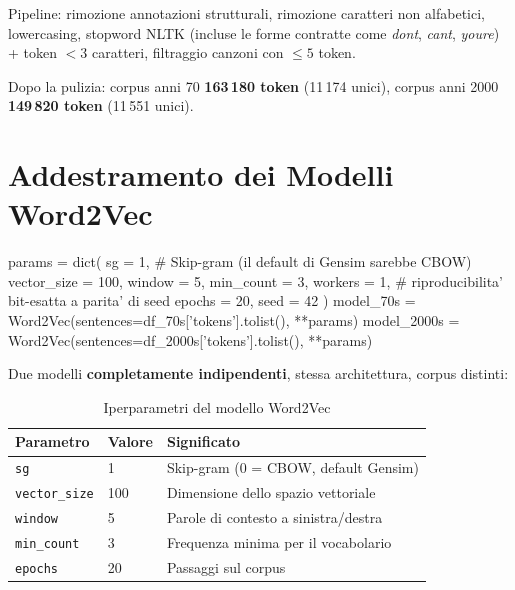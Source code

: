\documentclass[12pt,a4paper]{article}
\begin{document}
Pipeline: rimozione annotazioni strutturali, rimozione caratteri non alfabetici, lowercasing, stopword NLTK (incluse le forme contratte come \textit{dont}, \textit{cant}, \textit{youre}) + token $<3$ caratteri, filtraggio canzoni con $\le 5$ token.

Dopo la pulizia: corpus anni 70 \textbf{163\,180 token} (11\,174 unici), corpus anni 2000 \textbf{149\,820 token} (11\,551 unici).

\section{Addestramento dei Modelli Word2Vec}
\label{sec:addestramento-w2v}

\begin{pylisting}[title={Addestramento Word2Vec con Gensim}]
params = dict(
    sg          = 1,     # Skip-gram (il default di Gensim sarebbe CBOW)
    vector_size = 100, window = 5, min_count = 3,
    workers     = 1,     # riproducibilita' bit-esatta a parita' di seed
    epochs      = 20, seed = 42
)
model_70s   = Word2Vec(sentences=df_70s['tokens'].tolist(),   **params)
model_2000s = Word2Vec(sentences=df_2000s['tokens'].tolist(), **params)
\end{pylisting}

Due modelli \textbf{completamente indipendenti}, stessa architettura, corpus distinti:

\begin{table}[H]
  \centering
  \caption{Iperparametri del modello Word2Vec}
  \begin{tabular}{lll}
    \toprule
    \textbf{Parametro} & \textbf{Valore} & \textbf{Significato} \\
    \midrule
    \texttt{sg}           & 1   & Skip-gram (0 = CBOW, default Gensim) \\
    \texttt{vector\_size} & 100 & Dimensione dello spazio vettoriale \\
    \texttt{window}       & 5   & Parole di contesto a sinistra/destra \\
    \texttt{min\_count}   & 3   & Frequenza minima per il vocabolario \\
    \texttt{epochs}       & 20  & Passaggi sul corpus \\
    \bottomrule
  \end{tabular}
\end{table}
\end{document}
